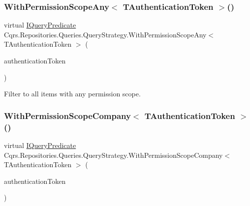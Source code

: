 \subsubsection{\texorpdfstring{With\+Permission\+Scope\+Any$<$ T\+Authentication\+Token $>$()}{WithPermissionScopeAny< TAuthenticationToken >()}}
{\footnotesize\ttfamily virtual \hyperlink{interfaceCqrs_1_1Repositories_1_1Queries_1_1IQueryPredicate}{I\+Query\+Predicate} Cqrs.\+Repositories.\+Queries.\+Query\+Strategy.\+With\+Permission\+Scope\+Any$<$ T\+Authentication\+Token $>$ (\begin{DoxyParamCaption}\item[{T\+Authentication\+Token}]{authentication\+Token }\end{DoxyParamCaption})\hspace{0.3cm}{\ttfamily [virtual]}}



Filter to all items with any permission scope. 

\mbox{\label{classCqrs_1_1Repositories_1_1Queries_1_1QueryStrategy_a822a0901976ceadb3f096326860e3006_a822a0901976ceadb3f096326860e3006}} 
\subsubsection{\texorpdfstring{With\+Permission\+Scope\+Company$<$ T\+Authentication\+Token $>$()}{WithPermissionScopeCompany< TAuthenticationToken >()}}
{\footnotesize\ttfamily virtual \hyperlink{interfaceCqrs_1_1Repositories_1_1Queries_1_1IQueryPredicate}{I\+Query\+Predicate} Cqrs.\+Repositories.\+Queries.\+Query\+Strategy.\+With\+Permission\+Scope\+Company$<$ T\+Authentication\+Token $>$ (\begin{DoxyParamCaption}\item[{T\+Authentication\+Token}]{authentication\+Token }\end{DoxyParamCaption})\hspace{0.3cm}{\ttfamily [virtual]}}



